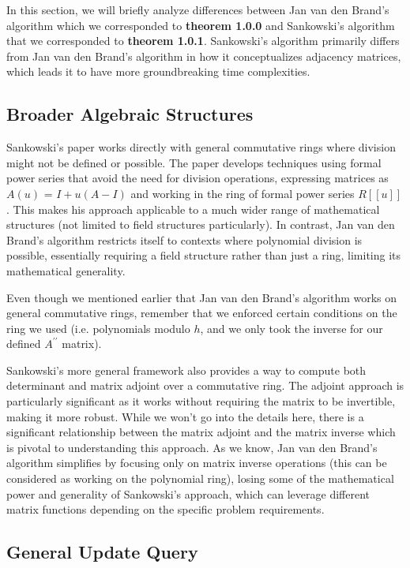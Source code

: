 \documentclass[12pt]{article}
\begin{document}
In this section, we will briefly analyze differences between Jan van den Brand's algorithm which we corresponded to \textbf{theorem 1.0.0} and Sankowski's algorithm that we corresponded to \textbf{theorem 1.0.1}. Sankowski's algorithm primarily differs from Jan van den Brand's algorithm in how it conceptualizes adjacency matrices, which leads it to have more groundbreaking time complexities.

\subsection{Broader Algebraic Structures}

Sankowski's paper works directly with general commutative rings where division might not be defined or possible. The paper develops techniques using formal power series that avoid the need for division operations, expressing matrices as $A(u)$ = $I + u(A - I)$ and working in the ring of formal power series $R[[u]]$. This makes his approach applicable to a much wider range of mathematical structures (not limited to field structures particularly). In contrast, Jan van den Brand's algorithm restricts itself to contexts where polynomial division is possible, essentially requiring a field structure rather than just a ring, limiting its mathematical generality.

{\footnotesize Even though we mentioned earlier that Jan van den Brand's algorithm works on general commutative rings, remember that we enforced certain conditions on the ring we used (i.e. polynomials modulo $h$, and we only took the inverse for our defined $A^{\prime \prime}$ matrix).}

Sankowski's more general framework also provides a way to compute both determinant and matrix adjoint over a commutative ring. The adjoint approach is particularly significant as it works without requiring the matrix to be invertible, making it more robust. While we won't go into the details here, there is a significant relationship between the matrix adjoint and the matrix inverse which is pivotal to understanding this approach. As we know, Jan van den Brand's algorithm simplifies by focusing only on matrix inverse operations (this can be considered as working on the polynomial ring), losing some of the mathematical power and generality of Sankowski's approach, which can leverage different matrix functions depending on the specific problem requirements.

\subsection{General Update Query}
\end{document}
